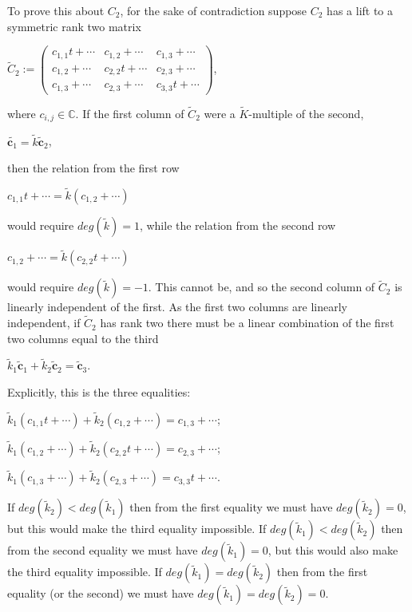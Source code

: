 \documentclass{article}
\begin{document}
To prove this about $C_{2}$, for the sake of contradiction suppose $C_{2}$ has a lift to a symmetric rank two matrix 
\begin{center}
  $\tilde{C}_{2} := \left(\begin{array}{ccc}c_{1,1}t + \cdots & c_{1,2} + \cdots & c_{1,3} + \cdots \\ c_{1,2} + \cdots & c_{2,2}t + \cdots & c_{2,3} + \cdots \\ c_{1,3} + \cdots & c_{2,3} + \cdots & c_{3,3}t + \cdots \end{array}\right)$,
\end{center}
where $c_{i,j} \in \mathbb{C}$.
If the first column of $\tilde{C}_{2}$ were a $\tilde{K}$-multiple of the second,
\begin{center}
  $\tilde{\textbf{c}_{1}} = \tilde{k}\tilde{\textbf{c}}_{2}$,
\end{center}
then the relation from the first row
\begin{center}
  $c_{1,1}t + \cdots = \tilde{k}(c_{1,2} + \cdots)$
\end{center}
would require $deg(\tilde{k}) = 1$, while the relation from the second row
\begin{center}
  $c_{1,2} + \cdots = \tilde{k}(c_{2,2}t + \cdots)$
\end{center}
would require $deg(\tilde{k}) = -1$. This cannot be, and so the second column of $\tilde{C}_{2}$ is linearly independent of the first.
As the first two columns are linearly independent, if $\tilde{C}_{2}$ has rank two there must be a linear combination of the first two columns equal to the third
\begin{center}
  $\tilde{k}_{1}\tilde{\textbf{c}}_{1} + \tilde{k}_{2}\tilde{\textbf{c}}_{2} = \tilde{\textbf{c}}_{3}$.
\end{center}
Explicitly, this is the three equalities:
\begin{center}
  $\tilde{k}_{1}(c_{1,1}t + \cdots) + \tilde{k}_{2}(c_{1,2} + \cdots) = c_{1,3} + \cdots$;  

  $\tilde{k}_{1}(c_{1,2} + \cdots) + \tilde{k}_{2}(c_{2,2}t + \cdots) = c_{2,3} + \cdots$;
 
  $\tilde{k}_{1}(c_{1,3} + \cdots) + \tilde{k}_{2}(c_{2,3} + \cdots) = c_{3,3}t + \cdots$.
\end{center}
If $deg(\tilde{k}_{2}) < deg(\tilde{k}_{1})$ then from the first equality we must have $deg(\tilde{k}_{2}) = 0$, but this would make the third equality impossible. If $deg(\tilde{k}_{1}) < deg(\tilde{k}_{2})$ then from the second equality we must have $deg(\tilde{k}_{1}) = 0$, but this would also make the third equality impossible. If $deg(\tilde{k}_{1}) = deg(\tilde{k}_{2})$ then from the first equality (or the second) we must have $deg(\tilde{k}_{1}) = deg(\tilde{k}_{2}) = 0$.
\end{document}
